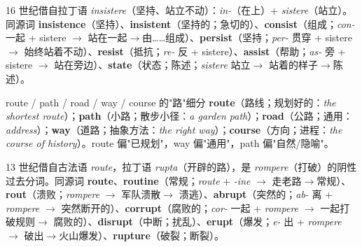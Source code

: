 \documentclass[../main.tex]{subfiles}
\begin{document}
\begin{origin}
16 世纪借自拉丁语 \textit{insistere}（坚持、站立不动）：\textit{in-}（在上）+ \textit{sistere}（站立）。同源词 \textbf{insistence}（坚持）、\textbf{insistent}（坚持的；急切的）、\textbf{consist}（组成；\textit{con-} 一起 + sistere $\to$ 站在一起$\to$由……组成）、\textbf{persist}（坚持；\textit{per-} 贯穿 + sistere $\to$ 始终站着不动）、\textbf{resist}（抵抗；\textit{re-} 反 + sistere）、\textbf{assist}（帮助；\textit{as-} 旁 + sistere $\to$ 站在旁边）、\textbf{state}（状态；陈述；\textit{sistere} 站立$\to$ 站着的样子$\to$陈述）。
\end{origin}




\begin{lex}{route / path / road / way / course 的"路"细分}
\textbf{route}（路线；规划好的：\textit{the shortest route}）；\textbf{path}（小路；散步小径：\textit{a garden path}）；\textbf{road}（公路；通用：\textit{address}）；\textbf{way}（道路；抽象方法：\textit{the right way}）；\textbf{course}（方向；进程：\textit{the course of history}）。route 偏"已规划"，way 偏"通用"，path 偏"自然/隐喻"。
\end{lex}

\begin{origin}
13 世纪借自古法语 \textit{route}，拉丁语 \textit{rupta}（开辟的路），是 \textit{rompere}（打破）的阴性过去分词。同源词 \textbf{route}、\textbf{routine}（常规；\textit{route} + \textit{-ine} $\to$ 走老路$\to$常规）、\textbf{rout}（溃败；\textit{rompere} $\to$ 军队溃散$\to$ 溃逃）、\textbf{abrupt}（突然的；\textit{ab-} 离 + \textit{rompere} $\to$ 突然断开的）、\textbf{corrupt}（腐败的；\textit{cor-} 一起 + \textit{rompere} $\to$ 一起打破规则$\to$ 腐败的）、\textbf{disrupt}（中断；扰乱）、\textbf{erupt}（爆发；\textit{e-} 出 + \textit{rompere} $\to$ 破出$\to$火山爆发）、\textbf{rupture}（破裂；断裂）。
\end{origin}


\end{document}
